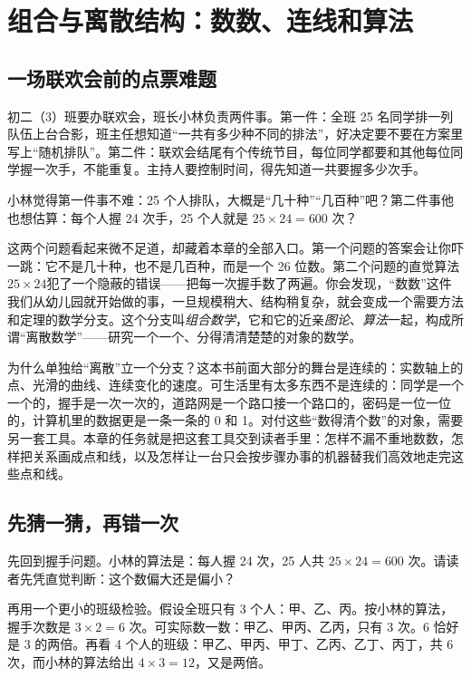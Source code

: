 \chapter{组合与离散结构：数数、连线和算法}

\section{一场联欢会前的点票难题}

初二（3）班要办联欢会，班长小林负责两件事。第一件：全班 25 名同学排一列队伍上台合影，班主任想知道“一共有多少种不同的排法”，好决定要不要在方案里写上“随机排队”。第二件：联欢会结尾有个传统节目，每位同学都要和其他每位同学握一次手，不能重复。主持人要控制时间，得先知道一共要握多少次手。

小林觉得第一件事不难：25 个人排队，大概是“几十种”“几百种”吧？第二件事他也想估算：每个人握 24 次手，25 个人就是 $25\times 24=600$ 次？

这两个问题看起来微不足道，却藏着本章的全部入口。第一个问题的答案会让你吓一跳：它不是几十种，也不是几百种，而是一个 26 位数。第二个问题的直觉算法$25\times24$犯了一个隐蔽的错误——把每一次握手数了两遍。你会发现，“数数”这件我们从幼儿园就开始做的事，一旦规模稍大、结构稍复杂，就会变成一个需要方法和定理的数学分支。这个分支叫\emph{组合数学}，它和它的近亲\emph{图论}、\emph{算法}一起，构成所谓“离散数学”——研究一个一个、分得清清楚楚的对象的数学。

为什么单独给“离散”立一个分支？这本书前面大部分的舞台是连续的：实数轴上的点、光滑的曲线、连续变化的速度。可生活里有太多东西不是连续的：同学是一个一个的，握手是一次一次的，道路网是一个路口接一个路口的，密码是一位一位的，计算机里的数据更是一条一条的 0 和 1。对付这些“数得清个数”的对象，需要另一套工具。本章的任务就是把这套工具交到读者手里：怎样不漏不重地数数，怎样把关系画成点和线，以及怎样让一台只会按步骤办事的机器替我们高效地走完这些点和线。

\section{先猜一猜，再错一次}

先回到握手问题。小林的算法是：每人握 24 次，25 人共 $25\times 24=600$ 次。请读者先凭直觉判断：这个数偏大还是偏小？

再用一个更小的班级检验。假设全班只有 3 个人：甲、乙、丙。按小林的算法，握手次数是 $3\times 2=6$ 次。可实际数一数：甲乙、甲丙、乙丙，只有 3 次。6 恰好是 3 的两倍。再看 4 个人的班级：甲乙、甲丙、甲丁、乙丙、乙丁、丙丁，共 6 次，而小林的算法给出 $4\times 3=12$，又是两倍。

